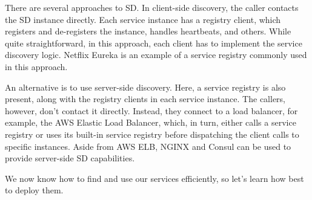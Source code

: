 There are several approaches to SD. In client-side discovery, the caller contacts the SD instance directly. Each service instance has a registry client, which registers and de-registers the instance, handles heartbeats, and others. While quite straightforward, in this approach, each client has to implement the service discovery logic. Netflix Eureka is an example of a service registry commonly used in this approach.

An alternative is to use server-side discovery. Here, a service registry is also present, along with the registry clients in each service instance. The callers, however, don't contact it directly. Instead, they connect to a load balancer, for example, the AWS Elastic Load Balancer, which, in turn, either calls a service registry or uses its built-in service registry before dispatching the client calls to specific instances. Aside from AWS ELB, NGINX and Consul can be used to provide server-side SD capabilities.

We now know how to find and use our services efficiently, so let's learn how best to deploy them.






